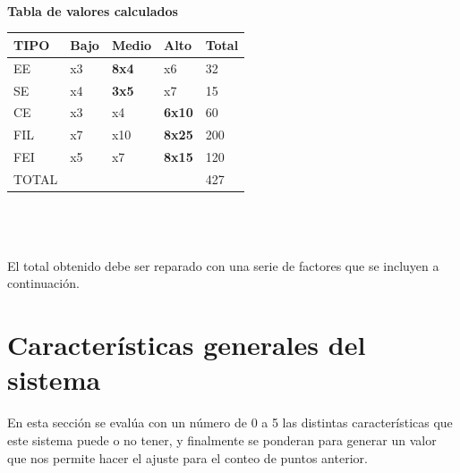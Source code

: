 \documentclass[a4paper,12pt,openany,oneside]{book}
\begin{document}
\\\\\\
\textbf{Tabla de valores calculados}\\
\begin{tabular}{| l | l | l | l | l |}
\hline
\textbf{TIPO} & \textbf{Bajo} & \textbf{Medio} & \textbf{Alto} & \textbf{Total} \\
\hline
EE & x3  & \textbf{8x4}  & x6 & 32\\
\hline
SE & x4  & \textbf{3x5}  & x7 & 15\\
\hline
CE & x3  & x4  & \textbf{6x10} & 60\\
\hline
FIL & x7 & x10 & \textbf{8x25} & 200\\
\hline
FEI & x5 & x7 & \textbf{8x15} & 120\\
\hline
TOTAL &  &  & & 427\\
\hline
\end{tabular}
\\\\\\
El total obtenido debe ser reparado con una serie de factores que se incluyen a continuación.

\section{Características generales del sistema}

En esta sección se evalúa con un número de 0 a 5 las distintas características que este sistema puede o no tener, y finalmente se ponderan para generar un valor que nos permite hacer el ajuste para el conteo de puntos anterior.
\end{document}
